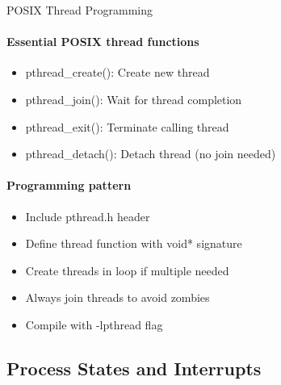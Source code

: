 \begin{KR}{POSIX Thread Programming}
    \paragraph{Essential POSIX thread functions}
    \begin{itemize}
        \item pthread\_create(): Create new thread
        \item pthread\_join(): Wait for thread completion
        \item pthread\_exit(): Terminate calling thread
        \item pthread\_detach(): Detach thread (no join needed)
    \end{itemize}
    
    \paragraph{Programming pattern}
    \begin{itemize}
        \item Include pthread.h header
        \item Define thread function with void* signature
        \item Create threads in loop if multiple needed
        \item Always join threads to avoid zombies
        \item Compile with -lpthread flag
    \end{itemize}
\end{KR}

\subsection{Process States and Interrupts}

